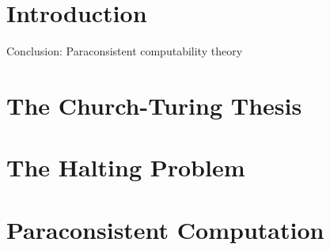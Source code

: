 \documentclass[12pt]{article}
\theoremstyle{definition}
\theoremstyle{remark}
\begin{document}
\maketitle

\section{Introduction}

Conclusion: Paraconsistent computability theory

\section{The Church-Turing Thesis}

\section{The Halting Problem}

\section{Paraconsistent Computation}
\end{document}
